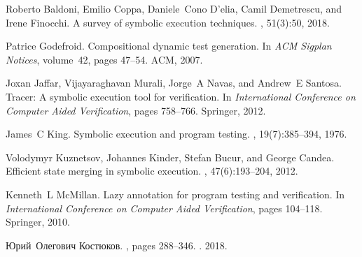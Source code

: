 \begin{thebibliography}{10}

Roberto Baldoni, Emilio Coppa, Daniele~Cono D’elia, Camil Demetrescu, and
  Irene Finocchi.
\newblock A survey of symbolic execution techniques.
, 51(3):50, 2018.

Patrice Godefroid.
\newblock Compositional dynamic test generation.
\newblock In {\em ACM Sigplan Notices}, volume~42, pages 47--54. ACM, 2007.

Joxan Jaffar, Vijayaraghavan Murali, Jorge~A Navas, and Andrew~E Santosa.
\newblock Tracer: A symbolic execution tool for verification.
\newblock In {\em International Conference on Computer Aided Verification},
  pages 758--766. Springer, 2012.

James~C King.
\newblock Symbolic execution and program testing.
, 19(7):385--394, 1976.

Volodymyr Kuznetsov, Johannes Kinder, Stefan Bucur, and George Candea.
\newblock Efficient state merging in symbolic execution.
, 47(6):193--204, 2012.

Kenneth~L McMillan.
\newblock Lazy annotation for program testing and verification.
\newblock In {\em International Conference on Computer Aided Verification},
  pages 104--118. Springer, 2010.

Юрий~Олегович Костюков.
, pages 288--346.
. 2018.

\end{thebibliography}
